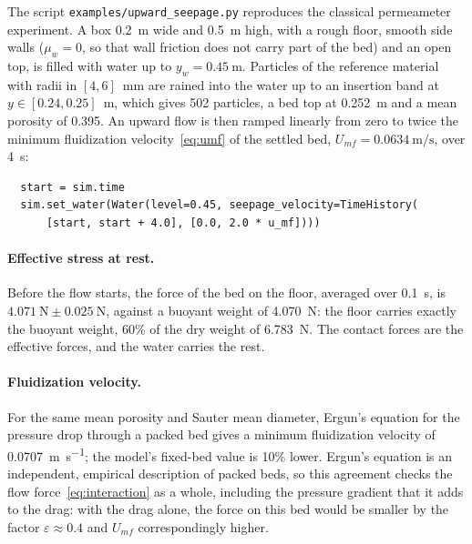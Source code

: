 The script \texttt{examples/upward\_seepage.py} reproduces the classical
permeameter experiment.  A box \qty{0.2}{\metre} wide and \qty{0.5}{\metre} high,
with a rough floor, smooth side walls ($\mu_{w}=0$, so that wall friction does
not carry part of the bed) and an open top, is filled with water up to
$y_{w}=\qty{0.45}{\metre}$.  Particles of the reference material with radii in
$[4,6]$~\unit{\milli\metre} are rained into the water up to an insertion band at
$y\in[0.24,0.25]$~\unit{\metre}, which gives \num{502} particles, a bed top at
\qty{0.252}{\metre} and a mean porosity of \num{0.395}.  An upward flow is then
ramped linearly from zero to twice the minimum fluidization
velocity~\eqref{eq:umf} of the settled bed, $U_{mf}=\qty{0.0634}{\metre\per\second}$,
over \qty{4}{\second}:
\begin{verbatim}
  start = sim.time
  sim.set_water(Water(level=0.45, seepage_velocity=TimeHistory(
      [start, start + 4.0], [0.0, 2.0 * u_mf])))
\end{verbatim}

\paragraph{Effective stress at rest.}  Before the flow starts, the force of the
bed on the floor, averaged over \qty{0.1}{\second}, is
$\qty{4.071}{\newton}\pm\qty{0.025}{\newton}$, against a buoyant weight of
\qty{4.070}{\newton}: the floor carries exactly the buoyant weight, \num{60}\% of
the dry weight of \qty{6.783}{\newton}.  The contact forces are the effective
forces, and the water carries the rest.

\paragraph{Fluidization velocity.}  For the same mean porosity and Sauter mean
diameter, Ergun's equation for the pressure drop through a packed bed gives a
minimum fluidization velocity of \qty{0.0707}{\metre\per\second}; the model's
fixed-bed value is \num{10}\% lower.  Ergun's equation is an independent,
empirical description of packed beds, so this agreement checks the flow
force~\eqref{eq:interaction} as a whole, including the pressure gradient that it
adds to the drag: with the drag alone, the force on this bed would be smaller by
the factor $\varepsilon\approx0.4$ and $U_{mf}$ correspondingly higher.

